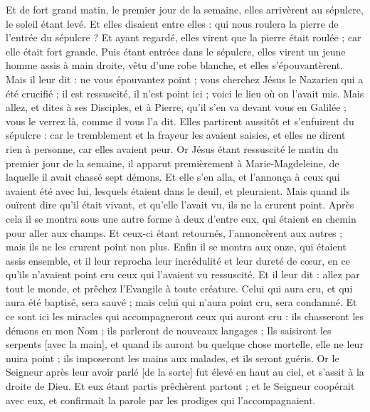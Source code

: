 \begin{multicols}{2}
Et de fort grand matin, le premier jour de la semaine, elles arrivèrent au sépulcre, le soleil étant levé.
Et elles disaient entre elles : qui nous roulera la pierre de l'entrée du sépulcre ?
Et ayant regardé, elles virent que la pierre était roulée ; car elle était fort grande.
Puis étant entrées dans le sépulcre, elles virent un jeune homme assis à main droite, vêtu d'une robe blanche, et elles s'épouvantèrent.
Mais il leur dit : ne vous épouvantez point ; vous cherchez Jésus le Nazarien qui a été crucifié ; il est ressuscité, il n'est point ici ; voici le lieu où on l'avait mis.
Mais allez, et dites à ses Disciples, et à Pierre, qu'il s'en va devant vous en Galilée ; vous le verrez là, comme il vous l'a dit.
Elles partirent aussitôt et s'enfuirent du sépulcre : car le tremblement et la frayeur les avaient saisies, et elles ne dirent rien à personne, car elles avaient peur.
Or Jésus étant ressuscité le matin du premier jour de la semaine, il apparut premièrement à Marie-Magdeleine, de laquelle il avait chassé sept démons.
Et elle s'en alla, et l'annonça à ceux qui avaient été avec lui, lesquels étaient dans le deuil, et pleuraient.
Mais quand ils ouïrent dire qu'il était vivant, et qu'elle l'avait vu, ils ne la crurent point.
Après cela il se montra sous une autre forme à deux d'entre eux, qui étaient en chemin pour aller aux champs.
Et ceux-ci étant retournés, l'annoncèrent aux autres ; mais ils ne les crurent point non plus.
Enfin il se montra aux onze, qui étaient assis ensemble, et il leur reprocha leur incrédulité et leur dureté de cœur, en ce qu'ils n'avaient point cru ceux qui l'avaient vu ressuscité.
Et il leur dit : allez par tout le monde, et prêchez l'Evangile à toute créature.
Celui qui aura cru, et qui aura été baptisé, sera sauvé ; mais celui qui n'aura point cru, sera condamné.
Et ce sont ici les miracles qui accompagneront ceux qui auront cru : ils chasseront les démons en mon Nom ; ils parleront de nouveaux langages ;
Ils saisiront les serpents [avec la main], et quand ils auront bu quelque chose mortelle, elle ne leur nuira point ; ils imposeront les mains aux malades, et ils seront guéris.
Or le Seigneur après leur avoir parlé [de la sorte] fut élevé en haut au ciel, et s'assit à la droite de Dieu.
Et eux étant partis prêchèrent partout ; et le Seigneur coopérait avec eux, et confirmait la parole par les prodiges qui l'accompagnaient.
\PPE{}
\end{multicols}
